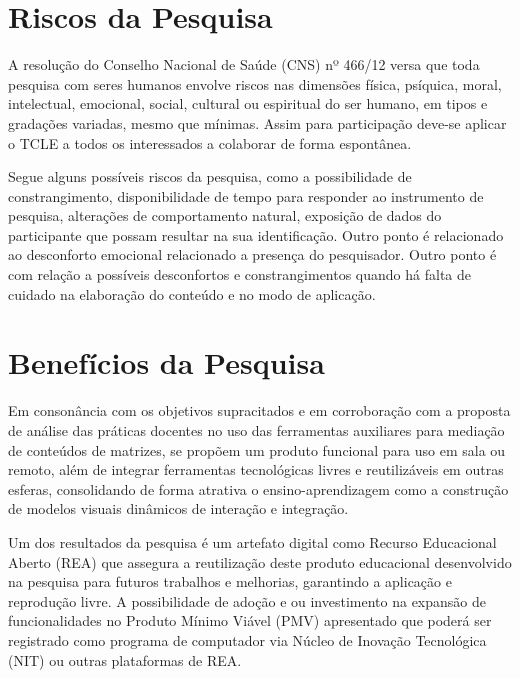 \section{Riscos da Pesquisa}
\label{riscos_pesquisa}

A resolução do Conselho Nacional de Saúde (CNS) nº 466/12 versa que toda pesquisa com seres humanos envolve riscos nas dimensões física, psíquica, moral, intelectual, emocional, social, cultural ou espiritual do ser humano, em tipos e gradações variadas, mesmo que mínimas. Assim para participação deve-se aplicar o TCLE a todos os interessados a colaborar de forma espontânea.


Segue alguns possíveis riscos da pesquisa, como a possibilidade de constrangimento, disponibilidade de tempo para responder ao instrumento de pesquisa, alterações de comportamento natural, exposição de dados do participante que possam resultar na sua identificação. Outro ponto é relacionado ao desconforto emocional relacionado a presença do pesquisador. Outro ponto é com relação a possíveis desconfortos e constrangimentos quando há falta de cuidado na elaboração do conteúdo e no modo de aplicação.






\section{Benefícios da Pesquisa}
\label{beneficios_pesquisa}

Em consonância com os objetivos supracitados e em corroboração com a proposta de análise das práticas docentes no uso das ferramentas auxiliares para mediação de conteúdos de matrizes, se propõem um produto funcional para uso em sala ou remoto, além de integrar ferramentas tecnológicas livres e reutilizáveis em outras esferas, consolidando de forma atrativa o ensino-aprendizagem como a construção de modelos visuais dinâmicos de interação e integração. 

Um dos resultados da pesquisa é um artefato digital como Recurso Educacional Aberto (REA) que assegura a reutilização deste produto educacional desenvolvido na pesquisa para futuros trabalhos e melhorias, garantindo a aplicação e reprodução livre. A possibilidade de adoção e ou investimento na expansão de funcionalidades no Produto Mínimo Viável (PMV) apresentado que poderá ser registrado como programa de computador via Núcleo de Inovação Tecnológica (NIT) ou outras plataformas de REA.






